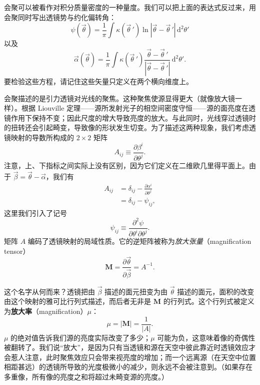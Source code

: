 会聚可以被看作对积分质量密度的一种量度。我们可以把上面的表达式反过来，用会聚同时写出透镜势与约化偏转角：
\begin{equation*}
\psi(\vec{\theta}) = \frac{1}{\pi}\int \kappa(\vec{\theta}\,')\ln|\vec{\theta}-\vec{\theta}\,'|\,\mathrm{d}^{2}\theta'
\tag{8.143}
\end{equation*}
以及
\begin{equation*}
\vec{\alpha}(\vec{\theta}) = \frac{1}{\pi}\int \kappa(\vec{\theta}\,')\frac{\vec{\theta}-\vec{\theta}\,'}{|\vec{\theta}-\vec{\theta}\,'|}\,\mathrm{d}^{2}\theta'.
\tag{8.144}
\end{equation*}
要检验这些方程，请记住这些矢量只定义在两个横向维度上。

会聚描述的是引力透镜对光线的聚焦。这种聚焦使源显得更大（就像放大镜一样）。根据 Liouville 定理——源所发射光子的相空间密度守恒——源的面亮度在透镜作用下保持不变；因此尺度的增大导致亮度的放大。与此同时，光线穿过透镜时的扭转还会引起畸变，导致像的形状发生切变。为了描述这两种现象，我们考虑透镜映射的导数所构成的 $2\times 2$ 矩阵
\begin{equation*}
A_{ij} \equiv \frac{\partial\beta^{i}}{\partial\theta^{j}}.
\tag{8.145}
\end{equation*}
注意，上、下指标之间实际上没有区别，因为它们定义在二维欧几里得平面上。由于 $\vec{\beta}=\vec{\theta}-\vec{\alpha}$，我们有
\begin{align*}
A_{ij} &= \delta_{ij} - \frac{\partial\alpha^{i}}{\partial\theta^{j}}\\
&= \delta_{ij} - \psi_{ij},
\tag{8.146}
\end{align*}
这里我们引入了记号
\begin{equation*}
\psi_{ij} \equiv \frac{\partial^{2}\psi}{\partial\theta^{i}\partial\theta^{j}}.
\tag{8.147}
\end{equation*}
矩阵 $A$ 编码了透镜映射的局域性质。它的逆矩阵被称为\emph{放大张量}（magnification tensor）
\begin{equation*}
\boldsymbol{M} = \frac{\partial\vec{\theta}}{\partial\vec{\beta}} = A^{-1}.
\tag{8.148}
\end{equation*}

这个名字从何而来？透镜把由 $\vec{\beta}$ 描述的面元扭变为由 $\vec{\theta}$ 描述的面元，面积的改变由这个映射的雅可比行列式描述，而后者无非是 $\boldsymbol{M}$ 的行列式。这个行列式被定义为\textbf{放大率}（magnification）$\mu$：
\begin{equation*}
\mu = |\boldsymbol{M}| = \frac{1}{|A|}.
\tag{8.149}
\end{equation*}
$\mu$ 的绝对值告诉我们源的亮度实际改变了多少；$\mu$ 可能为负，这意味着像的奇偶性被翻转了。我们说“放大”，是因为只有当透镜和源在天空中彼此靠近时透镜效应才会惹人注意，此时聚焦效应只会带来视亮度的增加；而一个远离源（在天空中位置相距甚远）的透镜所导致的光度极微小的减少，则永远不会被注意到。（如果存在多重像，所有像的亮度之和将超过未畸变源的亮度。）

